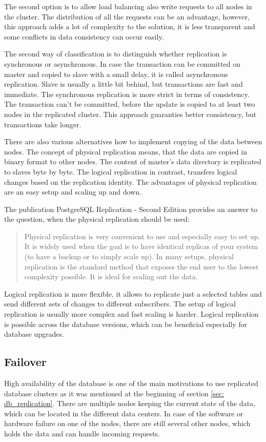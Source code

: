 \documentclass[
  digital, %
  twoside, %
  table,   %
  lof,     %
  lot,     %
]{fithesis3}
\begin{document}
The second option is to allow load balancing also write requests to all nodes in the cluster. The distribution of all the requests can be an advantage, however, this approach adds a lot of complexity to the solution, it is less transparent and some conflicts in data consistency can occur easily.

The second way of classification is to distinguish whether replication is synchronous or asynchronous. In case the transaction can be committed on master and copied to slave with a small delay, it is called asynchronous replication. Slave is usually a little bit behind, but transactions are fast and immediate. The synchronous replication is more strict in terms of consistency. The transaction can't be committed, before the update is copied to at least two nodes in the replicated cluster. This approach guaranties better consistency, but transactions take longer.

There are also various alternatives how to implement copying of the data between nodes. The concept of physical replication means, that the data are copied in binary format to other nodes. The content of master's data directory is replicated to slaves byte by byte. The logical replication in contrast, transfers logical changes based on the replication identity. The advantages of physical replication are an easy setup and scaling up and down.

The publication PostgreSQL Replication - Second Edition provides an answer to the question, when the physical replication should be used:
\begin{quote}
Physical replication is very convenient to use and especially easy to set up. It is
widely used when the goal is to have identical replicas of your system (to have a
backup or to simply scale up).
In many setups, physical replication is the standard method that exposes the end
user to the lowest complexity possible. It is ideal for scaling out the data. \cite{pg, p. 10.}
\end{quote}

Logical replication is more flexible, it allows to replicate just a selected tables and send different sets of changes to different subscribers. The setup of logical replication is usually more complex and fast scaling is harder. Logical replication is possible across the database versions, which can be beneficial especially for database upgrades.

\subsection{Failover}
High availability of the database is one of the main motivations to use replicated database clusters as it was mentioned at the beginning of section \ref{sec: db_replication}. There are multiple nodes keeping the current state of the data, which can be located in the different data centers. In case of the software or hardware failure on one of the nodes, there are still several other nodes, which holds the data and can handle incoming requests.
\end{document}
